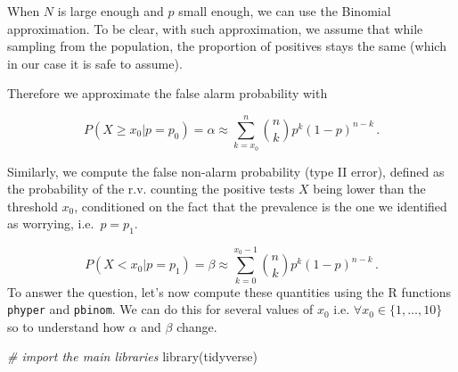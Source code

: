 \documentclass[
  oneside]{book}
\newenvironment{Shaded}{\begin{snugshade}}{\end{snugshade}}
\newcommand{\CommentTok}[1]{\textcolor[rgb]{0.56,0.35,0.01}{\textit{#1}}}
\newcommand{\FunctionTok}[1]{\textcolor[rgb]{0.00,0.00,0.00}{#1}}
\newcommand{\NormalTok}[1]{#1}
\begin{document}
When \(N\) is large enough and \(p\) small enough, we can use the Binomial
approximation. To be clear, with such approximation,
we assume that while sampling from the population, the proportion of positives
stays the same (which in our case it is safe to assume).

Therefore we approximate the false alarm probability with

\[
P(X \geq x_0 | p = p_0) = \alpha \approx \sum_{k = x_0}^{n}{\binom{n}{k}}p^{k}(1-p)^{n-k}\,.
\]

Similarly, we compute the false non-alarm probability (type II error), defined
as the probability of the r.v. counting the positive tests \(X\) being lower than
the threshold \(x_0\), conditioned on the fact that the prevalence is the one we
identified as worrying, i.e.~\(p = p_1\).

\[
P(X < x_0 | p = p_1) = \beta \approx \sum_{k = 0}^{x_0 - 1}{\binom{n}{k}}p^{k}(1-p)^{n-k}\,.
\]
To answer the question, let's now compute these quantities using the R functions
\texttt{phyper} and \texttt{pbinom}. We can do this for several values of \(x_0\) i.e.
\(\forall x_0 \in \{1, \dots, 10\}\) so to understand how \(\alpha\) and \(\beta\) change.

\begin{Shaded}
\begin{Highlighting}[]
\CommentTok{\# import the main libraries}
\FunctionTok{library}\NormalTok{(tidyverse)}
\end{Highlighting}
\end{Shaded}
\end{document}
